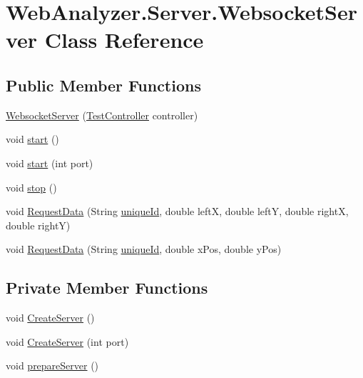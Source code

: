 \hypertarget{class_web_analyzer_1_1_server_1_1_websocket_server}{}\section{Web\+Analyzer.\+Server.\+Websocket\+Server Class Reference}
\label{class_web_analyzer_1_1_server_1_1_websocket_server}
\subsection*{Public Member Functions}
\begin{DoxyCompactItemize}
\item 
\hyperlink{class_web_analyzer_1_1_server_1_1_websocket_server_a3fddc08875cc188f4fb799ca4ccfe6ad}{Websocket\+Server} (\hyperlink{class_web_analyzer_1_1_controller_1_1_test_controller}{Test\+Controller} controller)
\item 
void \hyperlink{class_web_analyzer_1_1_server_1_1_websocket_server_a0afc1c5aad274b94fc9b0d461424d161}{start} ()
\item 
void \hyperlink{class_web_analyzer_1_1_server_1_1_websocket_server_ae006161a22122f220e0788cf8894cfb6}{start} (int port)
\item 
void \hyperlink{class_web_analyzer_1_1_server_1_1_websocket_server_a2c5391b6ebe427d2d42d7b601b922e5b}{stop} ()
\item 
void \hyperlink{class_web_analyzer_1_1_server_1_1_websocket_server_acab32c7df617492c47da886956332d9f}{Request\+Data} (String \hyperlink{_u_i_2_h_t_m_l_resources_2js_2lib_2underscore_8min_8js_af690ff5521d79c7128861033ae80ae17}{unique\+Id}, double left\+X, double left\+Y, double right\+X, double right\+Y)
\item 
void \hyperlink{class_web_analyzer_1_1_server_1_1_websocket_server_aa0ffcc2e38d0a5c7f85e6c50b283718a}{Request\+Data} (String \hyperlink{_u_i_2_h_t_m_l_resources_2js_2lib_2underscore_8min_8js_af690ff5521d79c7128861033ae80ae17}{unique\+Id}, double x\+Pos, double y\+Pos)
\end{DoxyCompactItemize}
\subsection*{Private Member Functions}
\begin{DoxyCompactItemize}
\item 
void \hyperlink{class_web_analyzer_1_1_server_1_1_websocket_server_adcca188d89d2ca8762b7e5d979857f28}{Create\+Server} ()
\item 
void \hyperlink{class_web_analyzer_1_1_server_1_1_websocket_server_a6bd50680516243f710b7eb189241b256}{Create\+Server} (int port)
\item 
void \hyperlink{class_web_analyzer_1_1_server_1_1_websocket_server_ad36bdf3fe5b0a9df1c652b67e504561c}{prepare\+Server} ()
\end{DoxyCompactItemize}
